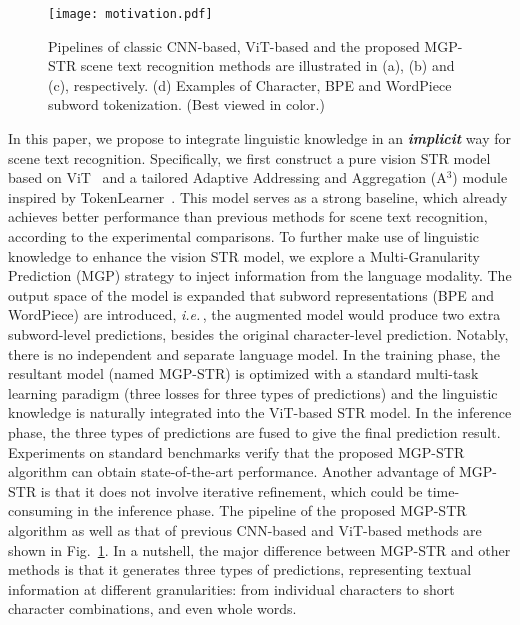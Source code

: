 \documentclass[runningheads]{llncs}
\def\ie{\emph{i.e.}\,}
\begin{document}
\begin{figure}[!htp]\centering
\vspace{-2mm}
 \texttt{[image: motivation.pdf]}
\vspace{-2mm}
 \caption{Pipelines of classic CNN-based, ViT-based and the proposed MGP-STR scene text recognition methods are illustrated in (a), (b) and (c), respectively. (d) Examples of Character, BPE and WordPiece subword tokenization. (Best viewed in color.) }
 \label{fig:motivation}
\vspace{-2mm}
\end{figure}
In this paper, we propose to integrate linguistic knowledge in an \textbf{\textit{implicit}} way for scene text recognition. Specifically, we first construct a pure vision STR model based on ViT~\cite{dosovitskiy2020image} and a tailored Adaptive Addressing and Aggregation (A$^3 $) module inspired by TokenLearner~\cite{tokenlearner}. This model serves as a strong baseline, which already achieves better performance than previous methods for scene text recognition, according to the experimental comparisons. To further make use of linguistic knowledge to enhance the vision STR model, we explore a Multi-Granularity Prediction (MGP) strategy to inject information from the language modality. The output space of the model is expanded that subword representations (BPE and WordPiece) are introduced, \ie, the augmented model would produce two extra subword-level predictions, besides the original character-level prediction. Notably, there is no independent and separate language model. In the training phase, the resultant model (named MGP-STR) is optimized 
with a standard multi-task learning paradigm (three losses for three types of predictions) and the linguistic knowledge is naturally integrated into the ViT-based STR model. In the inference phase, the three types of predictions are fused to give the final prediction result. Experiments on standard benchmarks verify that the proposed MGP-STR algorithm can obtain state-of-the-art performance. Another advantage of MGP-STR is that it does not involve iterative refinement, which could be time-consuming in the inference phase. The pipeline of the proposed MGP-STR algorithm as well as that of previous CNN-based and ViT-based methods are shown in Fig.~\ref{fig:motivation}. In a nutshell, the major difference between MGP-STR and other methods is that it generates three types of predictions, representing textual information at different granularities: from individual characters to short character combinations, and even whole words. 
\end{document}
